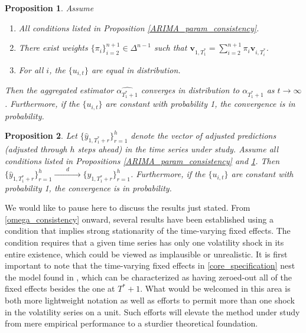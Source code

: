 \documentclass{uiucthesis2021}
\newcommand{\weight}{\pi}
\newtheorem{prop}{Proposition}
\theoremstyle{definition}
\begin{document}
  \begin{prop}\label{ARIMA_aggregated_alpha}
  Assume
    \begin{enumerate}
      \item All conditions listed in Proposition \ref{ARIMA_param_consistency}.
      \item There exist weights $\{\pi_{i}\}_{i=2}^{n+1} \in \Delta^{n-1}$  such that $\textbf{v}_{1,T_{1}^{*}} = \sum^{n+1}_{i=2}\weight_{i} \textbf{v}_{i,T_{i}^{*}}$.
      \item For all $i$, the $\{u_{i,t}\}$ are equal in distribution.
     \end{enumerate}
  
     Then the aggregated estimator $\hat{\alpha_{T^{*}_{1}+1}}$ converges in distribution to $\alpha_{T^{*}_{1}+1}$ as $t \rightarrow \infty$.  Furthermore, if the $\{u_{i,t}\}$ are constant with probability 1, the convergence is in probability.
    \end{prop}
  
  \begin{prop}\label{ARIMA_conv_distribution}
    Let $\{\hat y_{1,T_{1}^{*}+r}\}^{h}_{r=1}$ denote the vector of adjusted predictions (adjusted through $h$ steps ahead) in the time series under study.  Assume all conditions listed in Propositions \ref{ARIMA_param_consistency} and \ref{ARIMA_aggregated_alpha}.  Then $\{\hat y_{1,T_{1}^{*}+r}\}^{h}_{r=1} \xrightarrow{\qquad d\qquad} \{ y_{1,T_{1}^{*}+r}\}^{h}_{r=1}$.  Furthermore, if the $\{u_{i,t}\}$ are constant with probability 1, the convergence is in probability. 
    \end{prop}

  We would like to pause here to discuss the results just stated.  From \ref{omega_consistency} onward, several results have been established using a condition that implies strong stationarity of the time-varying fixed effects.  The condition requires that a given time series has only one volatility shock in its entire existence, which could be viewed as implausible or unrealistic.
 It is first important to note that the time-varying fixed effects in \ref{core_specification} nest the model found in \cite[][]{lin2021minimizing}, which can be characterized as having zeroed-out all of the fixed effects besides the one at $T^{*}+1$.  What would be welcomed in this area is both more lightweight notation as well as efforts to permit more than one shock in the volatility series on a unit.  Such efforts will elevate the method under study from mere empirical performance to a sturdier theoretical foundation. 
\end{document}
